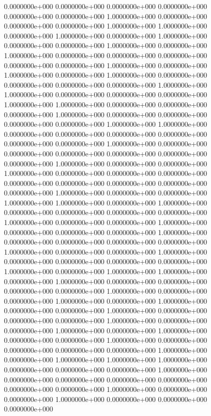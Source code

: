  0.0000000e+000  0.0000000e+000  0.0000000e+000  0.0000000e+000  0.0000000e+000
  0.0000000e+000  1.0000000e+000  0.0000000e+000  0.0000000e+000  0.0000000e+000
  1.0000000e+000  1.0000000e+000  0.0000000e+000  1.0000000e+000  0.0000000e+000
  1.0000000e+000  0.0000000e+000  0.0000000e+000  1.0000000e+000  0.0000000e+000
  1.0000000e+000  0.0000000e+000  0.0000000e+000  0.0000000e+000  0.0000000e+000
  0.0000000e+000  1.0000000e+000  0.0000000e+000  1.0000000e+000  0.0000000e+000
  1.0000000e+000  0.0000000e+000  0.0000000e+000  0.0000000e+000  0.0000000e+000
  1.0000000e+000  1.0000000e+000  0.0000000e+000  0.0000000e+000  0.0000000e+000
  1.0000000e+000  1.0000000e+000  0.0000000e+000  0.0000000e+000  0.0000000e+000
  1.0000000e+000  0.0000000e+000  0.0000000e+000  0.0000000e+000  0.0000000e+000
  1.0000000e+000  1.0000000e+000  0.0000000e+000  0.0000000e+000  0.0000000e+000
  0.0000000e+000  0.0000000e+000  0.0000000e+000  1.0000000e+000  0.0000000e+000
  0.0000000e+000  0.0000000e+000  0.0000000e+000  0.0000000e+000  0.0000000e+000
  1.0000000e+000  0.0000000e+000  0.0000000e+000  1.0000000e+000  0.0000000e+000
  0.0000000e+000  0.0000000e+000  0.0000000e+000  0.0000000e+000  0.0000000e+000
  0.0000000e+000  0.0000000e+000  1.0000000e+000  0.0000000e+000  0.0000000e+000
  1.0000000e+000  1.0000000e+000  0.0000000e+000  1.0000000e+000  0.0000000e+000
  0.0000000e+000  0.0000000e+000  0.0000000e+000  1.0000000e+000  0.0000000e+000
  0.0000000e+000  1.0000000e+000  0.0000000e+000  0.0000000e+000  0.0000000e+000
  1.0000000e+000  0.0000000e+000  0.0000000e+000  0.0000000e+000  0.0000000e+000
  1.0000000e+000  0.0000000e+000  0.0000000e+000  1.0000000e+000  0.0000000e+000
  0.0000000e+000  0.0000000e+000  0.0000000e+000  1.0000000e+000  0.0000000e+000
  1.0000000e+000  1.0000000e+000  0.0000000e+000  1.0000000e+000  0.0000000e+000
  0.0000000e+000  0.0000000e+000  0.0000000e+000  1.0000000e+000  0.0000000e+000
  0.0000000e+000  1.0000000e+000  0.0000000e+000  1.0000000e+000  0.0000000e+000
  0.0000000e+000  1.0000000e+000  0.0000000e+000  0.0000000e+000  0.0000000e+000
  1.0000000e+000  0.0000000e+000  0.0000000e+000  1.0000000e+000  0.0000000e+000
  1.0000000e+000  0.0000000e+000  0.0000000e+000  1.0000000e+000  0.0000000e+000
  0.0000000e+000  0.0000000e+000  0.0000000e+000  1.0000000e+000  0.0000000e+000
  1.0000000e+000  1.0000000e+000  1.0000000e+000  0.0000000e+000  0.0000000e+000
  0.0000000e+000  1.0000000e+000  0.0000000e+000  0.0000000e+000  0.0000000e+000
  0.0000000e+000  0.0000000e+000  0.0000000e+000  1.0000000e+000  0.0000000e+000
  0.0000000e+000  1.0000000e+000  0.0000000e+000  0.0000000e+000  0.0000000e+000
